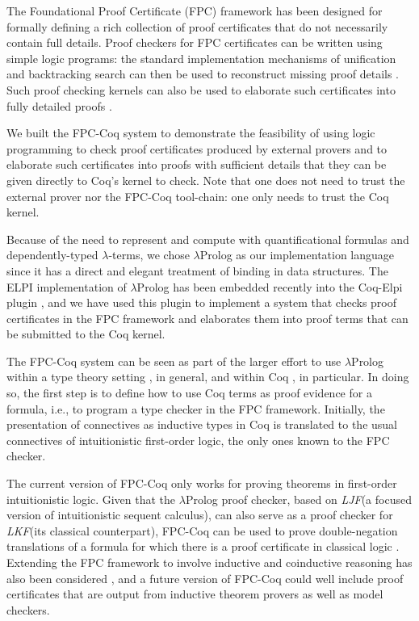 \documentclass[a4paper]{easychair}
\newcommand{\lP}{$\lambda$Prolog\xspace}
\newcommand{\LKF}{\hbox{\sl LKF}\xspace}
\newcommand{\LJF}{\hbox{\sl LJF}\xspace}
\newcommand{\fpccoq}{FPC-Coq\xspace}
\begin{document}
The Foundational Proof Certificate (FPC) framework \cite{chihani17jar}
has been designed for formally defining a rich collection of proof
certificates that do not necessarily contain full details.  Proof
checkers for FPC certificates can be written using simple logic
programs: the standard implementation mechanisms of unification and
backtracking search can then be used to reconstruct missing proof
details \cite{miller17fac}.  Such proof checking kernels can also be
used to elaborate such certificates into fully detailed proofs
\cite{blanco17phd,blanco17cade}.

We built the \fpccoq system to demonstrate the feasibility of using
logic programming to check proof certificates produced by external
provers and to elaborate such certificates into proofs with sufficient
details that they can be given directly to Coq's kernel to
check.  Note that one does not need to trust the external prover nor
the \fpccoq tool-chain: one only needs to trust the Coq kernel.

Because of the need to represent and compute with quantificational
formulas and dependently-typed $\lambda$-terms, we chose \lP
\cite{miller12proghol} as our implementation language since it has a
direct and elegant treatment of binding in data structures.  The ELPI
implementation \cite{dunchev15lpar} of \lP has been embedded recently
into the Coq-Elpi plugin \cite{coq-elpi20web}, and we have used this
plugin to implement a system that checks proof certificates in the FPC
framework and elaborates them into proof terms that can be submitted
to the Coq kernel.

The \fpccoq system can be seen as part of the larger effort to use \lP
within a type theory setting \cite{coen19mscs}, in general, and within
Coq \cite{tassi19itp}, in particular. In doing so, the first step is to
define how to use Coq terms as proof evidence for a formula, i.e.,
to program a type checker in the FPC framework. Initially, the
presentation of connectives as inductive types in Coq is translated to
the usual connectives of intuitionistic first-order logic, the only ones
known to the FPC checker.

The current version of \fpccoq only works for proving theorems in
first-order intuitionistic logic.  Given that the \lP proof checker,
based on \LJF (a focused version of intuitionistic sequent calculus),
can also serve as a proof checker for \LKF (its classical
counterpart), \fpccoq can be used to prove double-negation
translations of a formula for which there is a proof certificate in
classical logic \cite{chihani17jar}.  Extending the FPC framework to
involve inductive and coinductive reasoning has also been considered
\cite{heath15pxtp,heath19jar}, and a future version of \fpccoq could
well include proof certificates that are output from inductive theorem
provers as well as model checkers.
\end{document}
